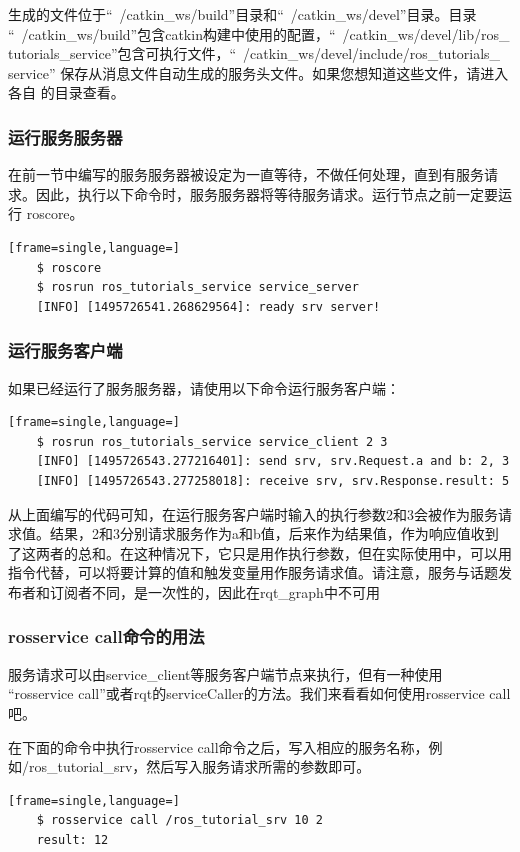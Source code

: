 \documentclass[geye,green,kindle,cn]{elegantnote}
\begin{document}
生成的文件位于“~/catkin_ws/build”目录和“~/catkin_ws/devel”目录。目录 “~/catkin_ws/build”包含catkin构建中使用的配置，“~/catkin_ws/devel/lib/ros_ tutorials_service”包含可执行文件，“~/catkin_ws/devel/include/ros_tutorials_ service” 保存从消息文件自动生成的服务头文件。如果您想知道这些文件，请进入各自 的目录查看。 
\subsubsection{运行服务服务器}
在前一节中编写的服务服务器被设定为一直等待，不做任何处理，直到有服务请 求。因此，执行以下命令时，服务服务器将等待服务请求。运行节点之前一定要运行 roscore。
\begin{lstlisting}[frame=single,language=]
    $ roscore 
    $ rosrun ros_tutorials_service service_server 
    [INFO] [1495726541.268629564]: ready srv server! 
\end{lstlisting}
\subsubsection{运行服务客户端}
如果已经运行了服务服务器，请使用以下命令运行服务客户端： 
\begin{lstlisting}[frame=single,language=]
    $ rosrun ros_tutorials_service service_client 2 3 
    [INFO] [1495726543.277216401]: send srv, srv.Request.a and b: 2, 3 
    [INFO] [1495726543.277258018]: receive srv, srv.Response.result: 5 
\end{lstlisting}

从上面编写的代码可知，在运行服务客户端时输入的执行参数2和3会被作为服务请求值。结果，2和3分别请求服务作为a和b值，后来作为结果值，作为响应值收到了这两者的总和。在这种情况下，它只是用作执行参数，但在实际使用中，可以用指令代替，可以将要计算的值和触发变量用作服务请求值。请注意，服务与话题发布者和订阅者不同，是一次性的，因此在rqt_graph中不可用
\subsubsection{rosservice call命令的用法}
服务请求可以由service_client等服务客户端节点来执行，但有一种使用 “rosservice call”或者rqt的serviceCaller的方法。我们来看看如何使用rosservice call吧。 

在下面的命令中执行rosservice call命令之后，写入相应的服务名称，例如/ros_tutorial_srv，然后写入服务请求所需的参数即可。 
\begin{lstlisting}[frame=single,language=]
    $ rosservice call /ros_tutorial_srv 10 2 
    result: 12 
\end{lstlisting}
\end{document}
